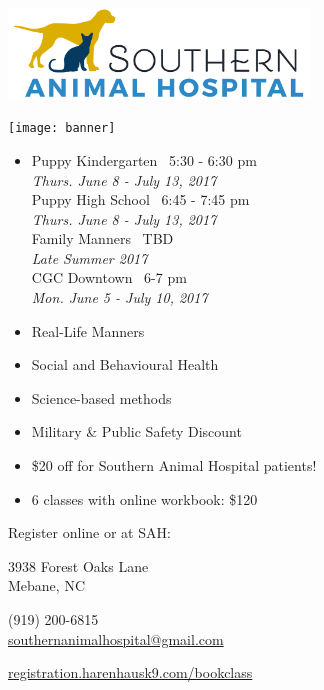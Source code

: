 \documentclass[14pt]{extarticle}
\begin{document}
\begin{center}
\includegraphics[width=0.6\textwidth]{SAH}
\end{center}
\texttt{[image: banner]}

\begin{multicols}{2}
\begin{itemize}
\item[]Puppy Kindergarten \textbar\ 5:30 - 6:30 pm\\
\emph{Thurs. June 8 - July 13, 2017}\\

Puppy High School \textbar\ 6:45 - 7:45 pm\\
\emph{Thurs. June 8 - July 13, 2017}\\

Family Manners \textbar\ TBD\\
\emph{Late Summer 2017}\\

CGC Downtown \textbar\ 6-7 pm\\
\emph{Mon. June 5 - July 10, 2017}

\end{itemize}
\columnbreak

\begin{itemize}
\item Real-Life Manners
\item Social and Behavioural Health
\item Science-based methods
\item Military \& Public Safety Discount
\item \$20 off for Southern Animal Hospital patients!
\item 6 classes with online workbook: \$120
\end{itemize}

\end{multicols}

\vfill

\begin{center}
\large{Register online or at SAH:}
\begin{multicols}{2}
3938 Forest Oaks Lane\\
Mebane, NC

\columnbreak
(919) 200-6815\\
\href{mailto:southernanimalhospital@gmail.com}{southernanimalhospital@gmail.com}
\end{multicols}

\href{http://registration.harenhausk9.com/bookclass}{\Large registration.harenhausk9.com/bookclass}
\end{center}
\end{document}
